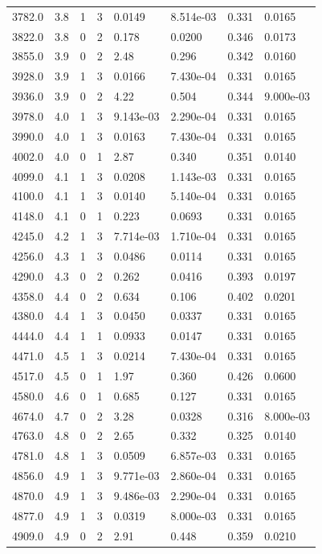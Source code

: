 \documentclass[preview]{standalone}
\begin{document}
{{{\begin{tabular}{L{1.2cm}C{1.2cm} C{0.3cm}C{0.5cm} C{1.4cm}C{1.4cm} C{1.4cm}C{1.4cm}}
  3782.0  &   3.8  & 1     &  3 &  0.0149  & 8.514e-03  & 0.331 &  0.0165   \\ 
  3822.0  &   3.8  & 0     &  2 &  0.178  & 0.0200  & 0.346 &  0.0173   \\ 
  3855.0  &   3.9  & 0     &  2 &  2.48  & 0.296  & 0.342 &  0.0160   \\ 
  3928.0  &   3.9  & 1     &  3 &  0.0166  & 7.430e-04  & 0.331 &  0.0165   \\ 
  3936.0  &   3.9  & 0     &  2 &  4.22  & 0.504  & 0.344 &  9.000e-03   \\ 
  3978.0  &   4.0  & 1     &  3 &  9.143e-03  & 2.290e-04  & 0.331 &  0.0165   \\ 
  3990.0  &   4.0  & 1     &  3 &  0.0163  & 7.430e-04  & 0.331 &  0.0165   \\ 
  4002.0  &   4.0  & 0     &  1 &  2.87  & 0.340  & 0.351 &  0.0140   \\ 
  4099.0  &   4.1  & 1     &  3 &  0.0208  & 1.143e-03  & 0.331 &  0.0165   \\ 
  4100.0  &   4.1  & 1     &  3 &  0.0140  & 5.140e-04  & 0.331 &  0.0165   \\ 
  4148.0  &   4.1  & 0     &  1 &  0.223  & 0.0693  & 0.331 &  0.0165   \\ 
  4245.0  &   4.2  & 1     &  3 &  7.714e-03  & 1.710e-04  & 0.331 &  0.0165   \\ 
  4256.0  &   4.3  & 1     &  3 &  0.0486  & 0.0114  & 0.331 &  0.0165   \\ 
  4290.0  &   4.3  & 0     &  2 &  0.262  & 0.0416  & 0.393 &  0.0197   \\ 
  4358.0  &   4.4  & 0     &  2 &  0.634  & 0.106  & 0.402 &  0.0201   \\ 
  4380.0  &   4.4  & 1     &  3 &  0.0450  & 0.0337  & 0.331 &  0.0165   \\ 
  4444.0  &   4.4  & 1     &  1 &  0.0933  & 0.0147  & 0.331 &  0.0165   \\ 
  4471.0  &   4.5  & 1     &  3 &  0.0214  & 7.430e-04  & 0.331 &  0.0165   \\ 
  4517.0  &   4.5  & 0     &  1 &  1.97  & 0.360  & 0.426 &  0.0600   \\ 
  4580.0  &   4.6  & 0     &  1 &  0.685  & 0.127  & 0.331 &  0.0165   \\ 
  4674.0  &   4.7  & 0     &  2 &  3.28  & 0.0328  & 0.316 &  8.000e-03   \\ 
  4763.0  &   4.8  & 0     &  2 &  2.65  & 0.332  & 0.325 &  0.0140   \\ 
  4781.0  &   4.8  & 1     &  3 &  0.0509  & 6.857e-03  & 0.331 &  0.0165   \\ 
  4856.0  &   4.9  & 1     &  3 &  9.771e-03  & 2.860e-04  & 0.331 &  0.0165   \\ 
  4870.0  &   4.9  & 1     &  3 &  9.486e-03  & 2.290e-04  & 0.331 &  0.0165   \\ 
  4877.0  &   4.9  & 1     &  3 &  0.0319  & 8.000e-03  & 0.331 &  0.0165   \\ 
  4909.0  &   4.9  & 0     &  2 &  2.91  & 0.448  & 0.359 &  0.0210   \\ 
\hline 
\end{tabular} 

}}}
\end{document}
